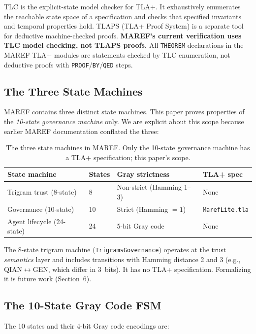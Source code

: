 \documentclass[11pt]{article}
\begin{document}
TLC is the explicit-state model checker for TLA+. It exhaustively enumerates
the reachable state space of a specification and checks that specified
invariants and temporal properties hold. TLAPS (TLA+ Proof System) is a
separate tool for deductive machine-checked proofs. \textbf{MAREF's current
verification uses TLC model checking, not TLAPS proofs.} All \texttt{THEOREM}
declarations in the MAREF TLA+ modules are statements checked by TLC
enumeration, not deductive proofs with \texttt{PROOF}/\texttt{BY}/\texttt{QED}
steps.

\subsection{The Three State Machines}

MAREF contains three distinct state machines. This paper proves properties of
the \emph{10-state governance machine} only. We are explicit about this scope
because earlier MAREF documentation conflated the three:

\begin{table}[h]
\centering
\begin{tabular}{llll}
\toprule
State machine & States & Gray strictness & TLA+ spec \\
\midrule
Trigram trust (8-state) & 8 & Non-strict (Hamming 1--3) & None \\
Governance (10-state) & 10 & Strict (Hamming $=1$) & \texttt{MarefLite.tla} \\
Agent lifecycle (24-state) & 24 & 5-bit Gray code & None \\
\bottomrule
\end{tabular}
\caption{The three state machines in MAREF. Only the 10-state governance
machine has a TLA+ specification; this paper's scope.}
\end{table}

The 8-state trigram machine (\texttt{TrigramsGovernance}) operates at the trust
\emph{semantics} layer and includes transitions with Hamming distance 2 and 3
(e.g., QIAN$\leftrightarrow$GEN, which differ in 3~bits). It has no TLA+
specification. Formalizing it is future work (Section~6).

\subsection{The 10-State Gray Code FSM}

The 10 states and their 4-bit Gray code encodings are:
\end{document}
